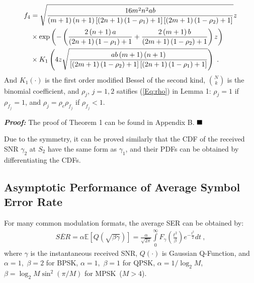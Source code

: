 \documentclass[onecolumn,letterpaper,11pt,draftclsnofoot]{IEEEtran}
\begin{document}
\begin{align}
f_4  &= \sqrt {\frac{{16m^2 n^2 ab}}{{\left(m + 1\right)\left(n
+1\right)\left[\left(2n + 1\right)\left(1 -\rho _1 \right) +
1\right]\left[\left(2m + 1\right)\left(1 - \rho _2 \right)+
1\right]}}} z\\\notag &\times \exp \left( - \left(\frac{{2\left(n +
1\right)a}}{{\left(2n + 1\right)\left(1 -\rho _1 \right) + 1}} +
\frac{{2\left(m + 1\right)b}}{{\left(2m + 1\right)\left(1 - \rho _2 \right) + 1}}\right)z\right)\notag\\
&\times K_1 \left( 4z\sqrt {\frac{{ab\left(m + 1\right)\left(n +
1\right)}}{{\left[\left(2m +1\right)\left(1 - \rho _2 \right) +
1\right]\left[\left(2n+ 1\right)\left(1 - \rho _1 \right) +
1\right]}}} \right)~.
\end{align}
And $K_1\left(\cdot\right)$ is the first order modified Bessel of
the second kind\cite{Abramowitz}, $\binom{N}{k}$ is the binomial
coefficient, and $\rho_j$, $j=1,2$ satifies (\ref{Eq:rho}) in Lemma
1: $\rho_j=1$ if $\rho_{f_j}=1$, and $\rho_j=\rho_e\rho_{f_j}$ if
$\rho_{f_j}<1$.

\emph{\textbf{Proof: }}The proof of Theorem 1 can be found in
Appendix B. $\hfill \blacksquare$

Due to the symmetry, it can be proved similarly that the CDF of the
received SNR $\gamma_2$ at $S_2$ have the same form as $\gamma_1$,
and their PDFs can be obtained by differentiating the CDFs.

\subsection{Asymptotic Performance of Average Symbol Error Rate}

For many common modulation formats, the average SER can be obtained
by\cite{Suraweera2010}:
\begin{align}
\overline {SER}  = \alpha \mathbb{E}  \left[Q\left(\sqrt {\beta
\gamma } \right)\right]= \frac{\alpha }{{\sqrt {2\pi }
}}\int\limits_0^\infty {F_\gamma \left(\frac{{t^2 }}{\beta
}\right)e^{ - \frac{{t^2 }}{2}} } dt~,\label{Eq:ps2}
\end{align}
where $\gamma$ is the instantaneous received SNR,
$Q\left(\cdot\right)$ is Gaussian Q-Function\cite{Abramowitz}, and
$\alpha=1$,~$\beta=2$ for BPSK, $\alpha=1$,~$\beta=1$ for QPSK,
$\alpha=1/\log _2 M$,~$\beta=\log _2 M\sin ^2 (\pi /M)$ for
MPSK~($M>4$).
\end{document}
